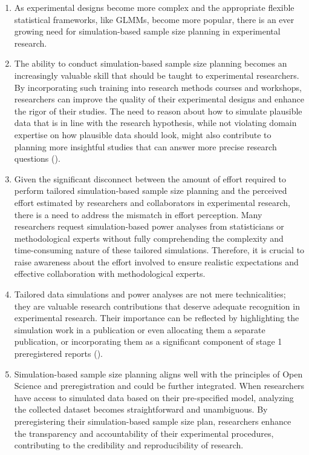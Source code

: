 \documentclass[
  man,
  floatsintext,
  longtable,
  a4paper,
  nolmodern,
  notxfonts,
  notimes,
  colorlinks=true,linkcolor=blue,citecolor=blue,urlcolor=blue]{apa7}
\begin{document}
\begin{enumerate}
\def\labelenumi{\arabic{enumi}.}
\item
  As experimental designs become more complex and the appropriate
  flexible statistical frameworks, like GLMMs, become more popular,
  there is an ever growing need for simulation-based sample size
  planning in experimental research.
\item
  The ability to conduct simulation-based sample size planning becomes
  an increasingly valuable skill that should be taught to experimental
  researchers. By incorporating such training into research methods
  courses and workshops, researchers can improve the quality of their
  experimental designs and enhance the rigor of their studies. The need
  to reason about how to simulate plausible data that is in line with
  the research hypothesis, while not violating domain expertise on how
  plausible data should look, might also contribute to planning more
  insightful studies that can answer more precise research questions
  ().
\item
  Given the significant disconnect between the amount of effort required
  to perform tailored simulation-based sample size planning and the
  perceived effort estimated by researchers and collaborators in
  experimental research, there is a need to address the mismatch in
  effort perception. Many researchers request simulation-based power
  analyses from statisticians or methodological experts without fully
  comprehending the complexity and time-consuming nature of these
  tailored simulations. Therefore, it is crucial to raise awareness
  about the effort involved to ensure realistic expectations and
  effective collaboration with methodological experts.
\item
  Tailored data simulations and power analyses are not mere
  technicalities; they are valuable research contributions that deserve
  adequate recognition in experimental research. Their importance can be
  reflected by highlighting the simulation work in a publication or even
  allocating them a separate publication, or incorporating them as a
  significant component of stage 1 preregistered reports
  ().
\item
  Simulation-based sample size planning aligns well with the principles
  of Open Science and preregistration and could be further integrated.
  When researchers have access to simulated data based on their
  pre-specified model, analyzing the collected dataset becomes
  straightforward and unambiguous. By preregistering their
  simulation-based sample size plan, researchers enhance the
  transparency and accountability of their experimental procedures,
  contributing to the credibility and reproducibility of research.
\end{enumerate}
\end{document}
